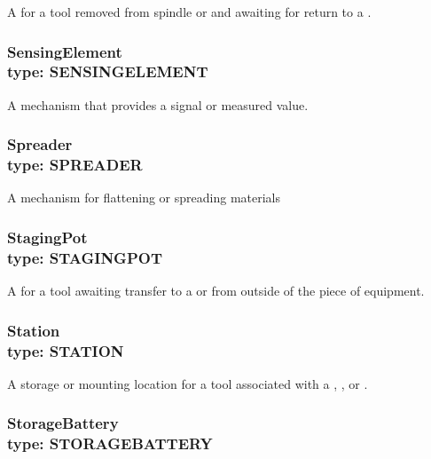 A  for a tool removed from \gls{spindle} or  and awaiting for return to a .



\subsubsection[SensingElement]{SensingElement \\ {\small type: SENSING\textunderscore ELEMENT}}
\label{sec:SensingElement}



A mechanism that provides a signal or measured value.



\subsubsection[Spreader]{Spreader \\ {\small type: SPREADER}}
\label{sec:Spreader}



A mechanism for flattening or spreading materials



\subsubsection[StagingPot]{StagingPot \\ {\small type: STAGING\textunderscore POT}}
\label{sec:StagingPot}



A  for a tool awaiting transfer to a  or  from outside of the piece of equipment.



\subsubsection[Station]{Station \\ {\small type: STATION}}
\label{sec:Station}



A storage or mounting location for a tool associated with a , , or .



\subsubsection[StorageBattery]{StorageBattery \\ {\small type: STORAGE\textunderscore BATTERY}}
\label{sec:StorageBattery}



